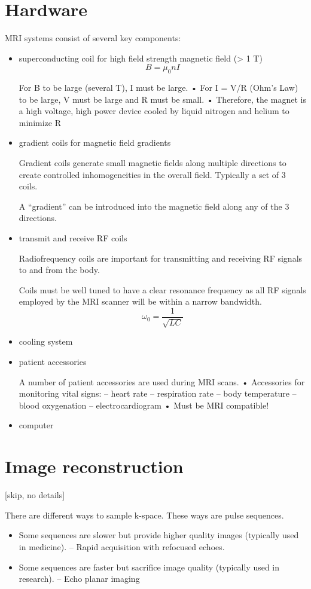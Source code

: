 \documentclass[UTF8,a4paper,11pt]{book}
\theoremstyle{mystyle}{
  \newtheorem{example}{Example}
}
\begin{document}
\section{Hardware}
MRI systems consist of several key
components:
\begin{itemize}
\item superconducting coil for high field strength
magnetic field (> 1 T)
\begin{equation}
B = \mu_0 n I
\end{equation}

 For B to be large (several T), I must be large.
• For I = V/R (Ohm’s Law) to be large, V must be
large and R must be small.
• Therefore, the magnet is a high voltage, high
power device cooled by liquid nitrogen and
helium to minimize R

\item gradient coils for magnetic field gradients

 Gradient coils generate small magnetic fields
along multiple directions to create controlled
inhomogeneities in the overall field. Typically a set of 3 coils.

A “gradient” can be introduced into the
magnetic field along any of the 3 directions.


\item transmit and receive RF coils

 Radiofrequency coils are important for
transmitting and receiving RF signals to and
from the body.

Coils must be well tuned to have a clear
resonance frequency as all RF signals
employed by the MRI scanner will be within a
narrow bandwidth.
\[
\omega_0=\frac{1}{\sqrt{LC}}
\]
\item cooling system
\item patient accessories

 A number of patient accessories are used
during MRI scans.
• Accessories for monitoring vital signs:
– heart rate
– respiration rate
– body temperature
– blood oxygenation
– electrocardiogram
• Must be MRI compatible!

\item computer
\end{itemize}

\section{Image reconstruction}
[skip, no details]

 There are different ways to sample k-space.
 These ways are pulse sequences.
 \begin{itemize}
\item Some sequences are slower but provide
higher quality images (typically used in
medicine).
– Rapid acquisition with refocused echoes.
\item Some sequences are faster but sacrifice image
quality (typically used in research).
– Echo planar imaging
 \end{itemize}
 
\end{document}
